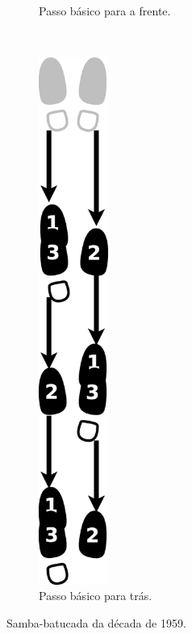 \begin{itemize}
\begin{figure}[h]
\begin{subfigure}[b]{0.4\textwidth}
        \caption{Passo básico para a frente.}
        \label{fig:samba-batucada-basico-frente}
    \end{subfigure}
    ~ %
    \begin{subfigure}[b]{0.4\textwidth}
        \centering
	\includegraphics[width=0.25\textwidth]{chapters/cap-historia-sambagafieira/samba-batucada-basico-tras.eps}
        \caption{Passo básico para trás.}
        \label{fig:samba-batucada-basico-tras}
    \end{subfigure}
    \caption{Samba-batucada da década de 1959.}\label{fig:samba-batucada-basico}
\end{figure}


\end{itemize}
